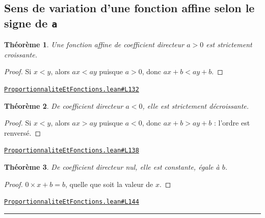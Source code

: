 \documentclass[11pt,a4paper]{article}
\theoremstyle{definition}
\theoremstyle{plain}
\newtheorem{theoreme}{Théorème}
\newcommand{\source}[2]{\par\smallskip\noindent\hfill{\footnotesize\href{#1}{\texttt{#2}}}\par\smallskip}
\begin{document}
\subsection{Sens de variation d'une fonction affine selon le signe de \texttt{a}}

\begin{theoreme}
Une fonction affine de coefficient directeur $a > 0$ est strictement croissante.
\end{theoreme}

\begin{proof}
Si $x < y$, alors $ax < ay$ puisque $a > 0$, donc $ax + b < ay + b$.
\end{proof}
\source{https://github.com/Commutator-IO/learn-lean/blob/main/cours/01-college/05-proportionnalite-et-fonctions/ProportionnaliteEtFonctions.lean\#L132}{ProportionnaliteEtFonctions.lean\#L132}

\begin{theoreme}
De coefficient directeur $a < 0$, elle est strictement décroissante.
\end{theoreme}

\begin{proof}
Si $x < y$, alors $ax > ay$ puisque $a < 0$, donc $ax + b > ay + b$ : l'ordre est
renversé.
\end{proof}
\source{https://github.com/Commutator-IO/learn-lean/blob/main/cours/01-college/05-proportionnalite-et-fonctions/ProportionnaliteEtFonctions.lean\#L138}{ProportionnaliteEtFonctions.lean\#L138}

\begin{theoreme}
De coefficient directeur nul, elle est constante, égale à $b$.
\end{theoreme}

\begin{proof}
$0 \times x + b = b$, quelle que soit la valeur de $x$.
\end{proof}
\source{https://github.com/Commutator-IO/learn-lean/blob/main/cours/01-college/05-proportionnalite-et-fonctions/ProportionnaliteEtFonctions.lean\#L144}{ProportionnaliteEtFonctions.lean\#L144}

\vfill
\noindent\rule{0.35\linewidth}{0.4pt}\par
{}
\end{document}
